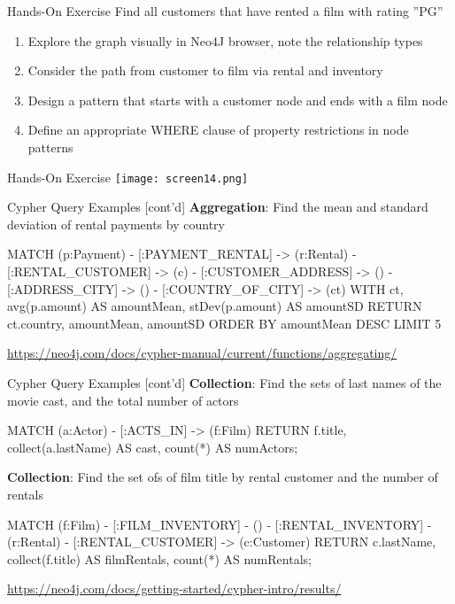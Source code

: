 \documentclass[ignorenonframetext,xcolor=x11names]{beamer}
\begin{document}
\begin{frame}{Hands-On Exercise}
\large
Find all customers that have rented a film with rating ''PG''\\
\normalsize
\begin{enumerate}
  \item Explore the graph visually in Neo4J browser, note the relationship types
  \item Consider the path from customer to film via rental and inventory
  \item Design a pattern that starts with a customer node and ends with a film node
  \item Define an appropriate WHERE clause of property restrictions in node patterns
\end{enumerate}
\end{frame}

\begin{frame}{Hands-On Exercise}
\texttt{[image: screen14.png]}
\end{frame}


\begin{frame}[fragile]{Cypher Query Examples \small [cont'd]}
\textbf{Aggregation}: Find the mean and standard deviation of rental payments by country
\footnotesize
\begin{cyphercode}
MATCH (p:Payment) 
        - [:PAYMENT_RENTAL] -> (r:Rental) 
        - [:RENTAL_CUSTOMER] -> (c) 
        - [:CUSTOMER_ADDRESS] -> () 
        - [:ADDRESS_CITY] -> ()
        - [:COUNTRY_OF_CITY] -> (ct)
WITH ct, 
     avg(p.amount) AS amountMean, 
     stDev(p.amount) AS amountSD
RETURN ct.country, amountMean, amountSD
ORDER BY amountMean DESC LIMIT 5
\end{cyphercode}

\scriptsize
\url{https://neo4j.com/docs/cypher-manual/current/functions/aggregating/}
\end{frame}

\begin{frame}[fragile]{Cypher Query Examples \small [cont'd]}
\textbf{Collection}: Find the sets of last names of the movie cast, and the total number of actors
\footnotesize
\begin{cyphercode}
MATCH (a:Actor) - [:ACTS_IN] -> (f:Film) 
RETURN f.title, 
       collect(a.lastName) AS cast, 
       count(*) AS numActors;
\end{cyphercode}
\normalsize
\textbf{Collection}: Find the set ofs of film title by rental customer and the number of rentals
\footnotesize
\begin{cyphercode}
MATCH (f:Film) - [:FILM_INVENTORY] 
    - () - [:RENTAL_INVENTORY] 
    - (r:Rental) - [:RENTAL_CUSTOMER] 
    -> (c:Customer)
RETURN c.lastName, 
       collect(f.title) AS filmRentals, 
       count(*) AS numRentals;
\end{cyphercode}

\scriptsize
\url{https://neo4j.com/docs/getting-started/cypher-intro/results/}
\end{frame}
\end{document}
